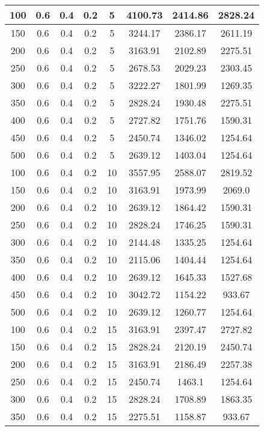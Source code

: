 \documentclass[a4paper, 12pt]{extreport}
\begin{document}
\begin{itemize}
\begin{longtable}{|c|c|c|c|c|c|c|c|}
			100 & 0.6 & 0.4 & 0.2 & 5 & 4100.73 & 2414.86 & 2828.24 \\\hline
			150 & 0.6 & 0.4 & 0.2 & 5 & 3244.17 & 2386.17 & 2611.19 \\\hline
			200 & 0.6 & 0.4 & 0.2 & 5 & 3163.91 & 2102.89 & 2275.51 \\\hline
			250 & 0.6 & 0.4 & 0.2 & 5 & 2678.53 & 2029.23 & 2303.45 \\\hline
			300 & 0.6 & 0.4 & 0.2 & 5 & 3222.27 & 1801.99 & 1269.35 \\\hline
			350 & 0.6 & 0.4 & 0.2 & 5 & 2828.24 & 1930.48 & 2275.51 \\\hline
			400 & 0.6 & 0.4 & 0.2 & 5 & 2727.82 & 1751.76 & 1590.31 \\\hline
			450 & 0.6 & 0.4 & 0.2 & 5 & 2450.74 & 1346.02 & 1254.64 \\\hline
			500 & 0.6 & 0.4 & 0.2 & 5 & 2639.12 & 1403.04 & 1254.64 \\\hline
			100 & 0.6 & 0.4 & 0.2 & 10 & 3557.95 & 2588.07 & 2819.52 \\\hline
			150 & 0.6 & 0.4 & 0.2 & 10 & 3163.91 & 1973.99 & 2069.0 \\\hline
			200 & 0.6 & 0.4 & 0.2 & 10 & 2639.12 & 1864.42 & 1590.31 \\\hline
			250 & 0.6 & 0.4 & 0.2 & 10 & 2828.24 & 1746.25 & 1590.31 \\\hline
			300 & 0.6 & 0.4 & 0.2 & 10 & 2144.48 & 1335.25 & 1254.64 \\\hline
			350 & 0.6 & 0.4 & 0.2 & 10 & 2115.06 & 1404.44 & 1254.64 \\\hline
			400 & 0.6 & 0.4 & 0.2 & 10 & 2639.12 & 1645.33 & 1527.68 \\\hline
			450 & 0.6 & 0.4 & 0.2 & 10 & 3042.72 & 1154.22 & 933.67 \\\hline
			500 & 0.6 & 0.4 & 0.2 & 10 & 2639.12 & 1260.77 & 1254.64 \\\hline
			100 & 0.6 & 0.4 & 0.2 & 15 & 3163.91 & 2397.47 & 2727.82 \\\hline
			150 & 0.6 & 0.4 & 0.2 & 15 & 2828.24 & 2120.19 & 2450.74 \\\hline
			200 & 0.6 & 0.4 & 0.2 & 15 & 3163.91 & 2186.49 & 2257.38 \\\hline
			250 & 0.6 & 0.4 & 0.2 & 15 & 2450.74 & 1463.1 & 1254.64 \\\hline
			300 & 0.6 & 0.4 & 0.2 & 15 & 2828.24 & 1708.89 & 1863.35 \\\hline
			350 & 0.6 & 0.4 & 0.2 & 15 & 2275.51 & 1158.87 & 933.67 \\\hline

\end{longtable}
\end{itemize}
\end{document}
